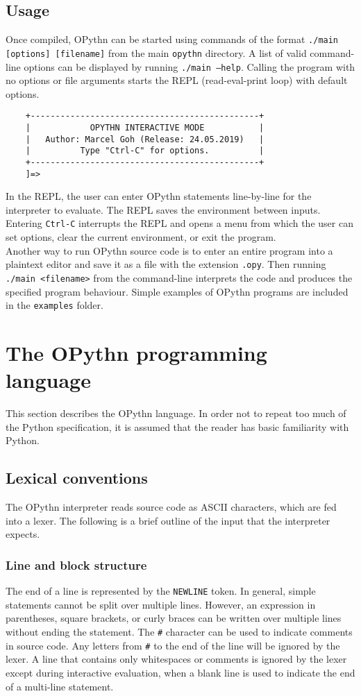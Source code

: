 \documentclass[11pt, twoside]{article}
\newcommand{\ms}{\texttt}
\begin{document}
    \subsection{Usage}
    Once compiled, OPythn can be started using commands of the format \ms{./main [options] [filename]} from the main \ms{opythn} directory. A list of valid command-line options can be displayed by running \ms{./main --help}. Calling the program with no options or file arguments starts the REPL (read-eval-print loop) with default options.
    \begin{lstlisting}
    +----------------------------------------------+
    |            OPYTHN INTERACTIVE MODE           |
    |   Author: Marcel Goh (Release: 24.05.2019)   |
    |          Type "Ctrl-C" for options.          |
    +----------------------------------------------+
    ]=>
    \end{lstlisting}
    In the REPL, the user can enter OPythn statements line-by-line for the interpreter to evaluate. The REPL saves the environment between inputs. Entering \ms{Ctrl-C} interrupts the REPL and opens a menu from which the user can set options, clear the current environment, or exit the program.\\
    \indent Another way to run OPythn source code is to enter an entire program into a plaintext editor and save it as a file with the extension \ms{.opy}. Then running \ms{./main <filename>} from the command-line interprets the code and produces the specified program behaviour. Simple examples of OPythn programs are included in the \ms{examples} folder.

\section{The OPythn programming language}
    This section describes the OPythn language. In order not to repeat too much of the Python specification, it is assumed that the reader has basic familiarity with Python.
    \subsection{Lexical conventions}
    The OPythn interpreter reads source code as ASCII characters, which are fed into a lexer. The following is a brief outline of the input that the interpreter expects.
    \subsubsection{Line and block structure}
    The end of a line is represented by the \ms{NEWLINE} token. In general, simple statements cannot be split over multiple lines. However, an expression in parentheses, square brackets, or curly braces can be written over multiple lines without ending the statement. The \ms{\#} character can be used to indicate comments in source code. Any letters from \ms{\#} to the end of the line will be ignored by the lexer. A line that contains only whitespaces or comments is ignored by the lexer except during interactive evaluation, when a blank line is used to indicate the end of a multi-line statement.\\
\end{document}
